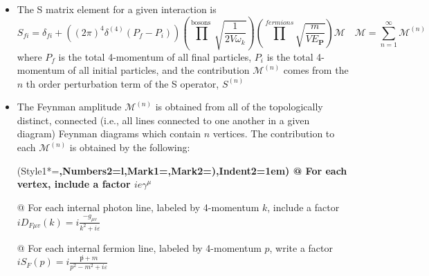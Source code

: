 \begin{itemize}
    \item The S matrix element for a given interaction is 
    $$
S_{f i}=\delta_{f i}+\left((2 \pi)^{4} \delta^{(4)}\left(P_{f}-P_{i}\right)\right) (\prod^{\text {bosons }} \sqrt{\frac{1}{2 V \omega_{k}}})(\prod^{fermions} \sqrt{\frac{m}{V E_{\mathbf{P}}}})\mathcal{M}\quad\mathcal{M}=\sum_{n=1}^{\infty} \mathcal{M}^{(n)}
$$
where $P_{f}$ is the total 4-momentum of all final particles, $P_{i}$ is the total 4-momentum of all initial particles, and the contribution $\mathcal{M}^{(n)}$ comes from the $n$ th order perturbation term of the S operator, $S^{(n)}$
\item The Feynman amplitude $\mathcal{M}^{(n)}$ is obtained from all of the topologically distinct, connected (i.e., all lines connected to one another in a given diagram) Feynman diagrams which contain $n$ vertices. The contribution to each $\mathcal{M}^{(n)}$ is obtained by the following:

\begin{easylist}
  \ListProperties(Style1*=\bfseries,Numbers2=l,Mark1={},Mark2={)},Indent2=1em)
 @ For each vertex, include a factor $ie\gamma^{\mu}$
    
    @ For each internal photon line, labeled by 4-momentum $k$, include a factor $i D_{F \mu v}(k)=i \frac{-g_{\mu v}}{k^{2}+i \varepsilon}$
    
    @ For each internal fermion line, labeled by 4-momentum $p$, write a factor $i S_{F}(p)=i \frac{\not p+m}{p^{2}-m^{2}+i \varepsilon}$
    

\end{easylist}
\end{itemize}
